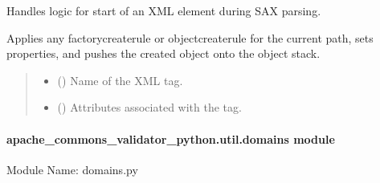 \documentclass[letterpaper,10pt,english]{sphinxmanual}
\begin{document}
\begin{fulllineitems}

\begin{fulllineitems}
\label{\detokenize{apache_commons_validator_python.util:apache_commons_validator_python.util.digester.Digester.startElement}}
\pysigstartsignatures
{}
\pysigstopsignatures
\sphinxAtStartPar
Handles logic for start of an XML element during SAX parsing.

\sphinxAtStartPar
Applies any factory\sphinxhyphen{}create\sphinxhyphen{}rule or object\sphinxhyphen{}create\sphinxhyphen{}rule for the current path,
sets properties, and pushes the created object onto the object stack.
\begin{quote}\begin{description}
\begin{itemize}
\item {} 
\sphinxAtStartPar
{} () \textendash{} Name of the XML tag.

\item {} 
\sphinxAtStartPar
{} () \textendash{} Attributes associated with the tag.

\end{itemize}

\end{description}\end{quote}

\end{fulllineitems}


\end{fulllineitems}



\paragraph{apache\_commons\_validator\_python.util.domains module}
\label{\detokenize{apache_commons_validator_python.util:module-apache_commons_validator_python.util.domains}}\label{\detokenize{apache_commons_validator_python.util:apache-commons-validator-python-util-domains-module}}
\sphinxAtStartPar
Module Name: domains.py
\end{document}
